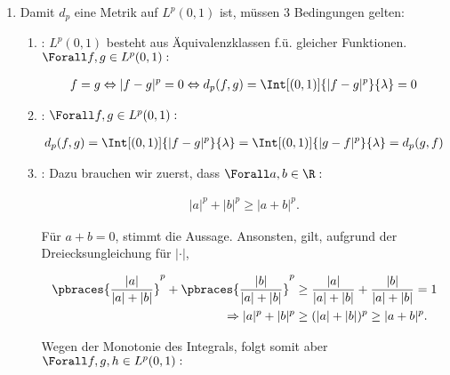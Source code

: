 \begin{solution}

\phantom{}

\begin{enumerate}[label = (\alph*)]

  \item
  Damit $d_p$ eine Metrik auf $L^p(0, 1)$ ist, müssen 3 Bedingungen gelten:

  \begin{enumerate}[label = (\roman*)]

    \item
    :
    $L^p(0, 1)$ besteht aus Äquivalenzklassen f.ü. gleicher Funktionen. $\Forall f, g \in L^p(0, 1):$

    \begin{align*}
      f = g
      \Leftrightarrow
      |f - g|^p = 0
      \Leftrightarrow
      d_p(f, g)
      =
      \Int[(0, 1)]{|f - g|^p}{\lambda} = 0
    \end{align*}

    \item
    :
    $\Forall f, g \in L^p(0, 1):$

    \begin{align*}
      d_p(f, g)
      =
      \Int[(0, 1)]{|f - g|^p}{\lambda}
      =
      \Int[(0, 1)]{|g - f|^p}{\lambda}
      =
      d_p(g, f)
    \end{align*}

    \item
    :
    Dazu brauchen wir zuerst, dass $\Forall a, b \in \R:$

    \begin{align*}
      |a|^p + |b|^p \geq |a + b|^p.
    \end{align*}

    Für $a + b = 0$, stimmt die Aussage.
    Ansonsten, gilt, aufgrund der Dreiecksungleichung für $|\cdot|$,

    \begin{align*}
      \pbraces{\frac{|a|}{|a| + |b|}}^p +
      \pbraces{\frac{|b|}{|a| + |b|}}^p
      & \geq
      \frac{|a|}{|a| + |b|} +
      \frac{|b|}{|a| + |b|} = 1 \\
      \Rightarrow
      |a|^p + |b|^p
      & \geq
      (|a| + |b|)^p
      \geq
      |a + b|^p.
    \end{align*}

    Wegen der Monotonie des Integrals, folgt somit aber $\Forall f, g, h \in L^p(0, 1):$


\end{enumerate}
\end{enumerate}
\end{solution}
